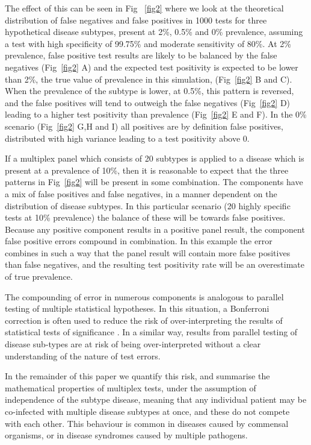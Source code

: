 \documentclass[10pt,letterpaper]{article}
\begin{document}
The effect of this can be seen in Fig ~\ref{fig2} where we look at the theoretical distribution of false negatives and false positives in 1000 tests for three hypothetical disease subtypes, present at 2\%, 0.5\% and 0\% prevalence, assuming a test with high specificity of 99.75\% and moderate sensitivity of 80\%. At 2\% prevalence, false positive test results are likely to be balanced by the false negatives (Fig~\ref{fig2} A) and the expected test positivity is expected to be lower than 2\%, the true value of prevalence in this simulation, (Fig~\ref{fig2} B and C). When the prevalence of the subtype is lower, at 0.5\%, this pattern is reversed, and the false positives will tend to outweigh the false negatives (Fig~\ref{fig2} D) leading to a higher test positivity than prevalence (Fig~\ref{fig2} E and F). In the 0\% scenario (Fig~\ref{fig2} G,H and I) all positives are by definition false positives,  distributed with high variance leading to a test positivity above 0.

If a multiplex panel which consists of 20 subtypes is applied to a disease which is present at a prevalence of 10\%, then it is reasonable to expect that the three patterns in Fig~\ref{fig2} will be present in some combination. The components have a mix of false positives and false negatives, in a manner dependent on the distribution of disease subtypes. In this particular scenario (20 highly specific tests at 10\% prevalence) the balance of these will be towards false positives. Because any positive component results in a positive panel result, the component false positive errors compound in combination. In this example the error combines in such a way that the panel result will contain more false positives than false negatives, and the resulting test positivity rate will be an overestimate of true prevalence.

The compounding of error in numerous components is analogous to parallel testing of multiple statistical hypotheses. In this situation, a Bonferroni correction is often used to reduce the risk of over-interpreting the results of statistical tests of significance \cite{shaffer1995}. In a similar way, results from parallel testing of disease sub-types are at risk of being over-interpreted without a clear understanding of the nature of test errors.

In the remainder of this paper we quantify this risk, and summarise the mathematical properties of multiplex tests, under the assumption of independence of the subtype disease, meaning that any individual patient may be co-infected with multiple disease subtypes at once, and these do not compete with each other. This behaviour is common in diseases caused by commensal organisms, or in disease syndromes caused by multiple pathogens.
\end{document}
